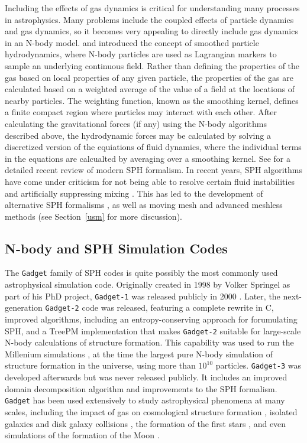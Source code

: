 \documentclass[11pt,twoside]{article}
\begin{document}
Including the effects of gas dynamics is critical for understanding many processes in astrophysics. Many problems include the coupled effects of particle dynamics and gas dynamics, so it becomes very appealing to directly include gas dynamics in an N-body model. \citet{lucy1977} and \citet{gingold1977} introduced the concept of smoothed particle hydrodynamics, where N-body particles are used as Lagrangian markers to sample an underlying continuous field. Rather than defining the properties of the gas based on local properties of any given particle, the properties of the gas are calculated based on a weighted average of the value of a field at the locations of nearby particles. The weighting function, known as the smoothing kernel, defines a finite compact region where particles may interact with each other. After calculating the gravitational forces (if any) using the N-body algorithms described above, the hydrodynamic forces may be calculated by solving a discretized version of the equiations of fluid dynamics, where the individual terms in the equations are calcualted by averaging over a smoothing kernel. See \citet{price2012} for a detailed recent review of modern SPH formalism. In recent years, SPH algorithms have come under criticism for not being able to resolve certain fluid instabilities \citep{agertz2007} and artificially suppressing mixing \citep{read2010}. This has led to the development of alternative SPH formalisms \citep{abel2011, hopkins2013}, as well as moving mesh and advanced meshless methods (see Section~\ref{usm} for more discussion).

\subsection{N-body and SPH Simulation Codes}

The \texttt{Gadget} family of SPH codes is quite possibly the most commonly used astrophysical simulation code. Originally created in 1998 by Volker Springel as part of his PhD project, \texttt{Gadget-1} was released publicly in 2000 \citep{springel2001}. Later, the next-generation \texttt{Gadget-2} code was released, featuring a complete rewrite in C, improved algorithms, including an entropy-conserving approach for forumulating SPH, and a TreePM implementation \citep{springel2005b} that makes \texttt{Gadget-2} suitable for large-scale N-body calculations of structure formation. This capability was used to run the Millenium simulations \citep{springel2005a}, at the time the largest pure N-body simulation of structure formation in the universe, using more than $10^{10}$ particles. \texttt{Gadget-3} was developed afterwards but was never released publicly. It includes an improved domain decomposition algorithm and improvements to the SPH formalism. \texttt{Gadget} has been used extensively to study astrophysical phenomena at many scales, including the impact of gas on cosmological structure formation \citep{schaye2015}, isolated galaxies \citep{springel2005c} and disk galaxy collisions \citep{robertson2006}, the formation of the first stars \citep{clark2011}, and even simulations of the formation of the Moon \citep{jackson2012}.
\end{document}
